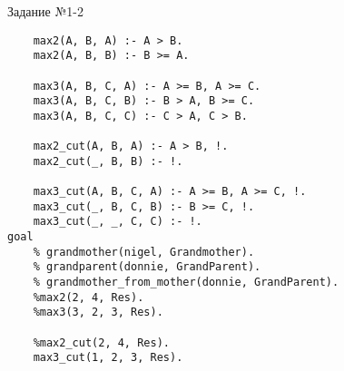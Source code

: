 \newpage

\begin{code}
\caption{Задание №1-2}
\label{code:bf3}
\begin{verbatim}
	max2(A, B, A) :- A > B.
	max2(A, B, B) :- B >= A.
	
	max3(A, B, C, A) :- A >= B, A >= C.
	max3(A, B, C, B) :- B > A, B >= C.
	max3(A, B, C, C) :- C > A, C > B.
	
	max2_cut(A, B, A) :- A > B, !.
	max2_cut(_, B, B) :- !.

	max3_cut(A, B, C, A) :- A >= B, A >= C, !.
	max3_cut(_, B, C, B) :- B >= C, !.
	max3_cut(_, _, C, C) :- !.
goal
	% grandmother(nigel, Grandmother).
	% grandparent(donnie, GrandParent).
	% grandmother_from_mother(donnie, GrandParent).				  
	%max2(2, 4, Res).
	%max3(3, 2, 3, Res).
	
	%max2_cut(2, 4, Res).
	max3_cut(1, 2, 3, Res).
\end{verbatim}
\end{code}

